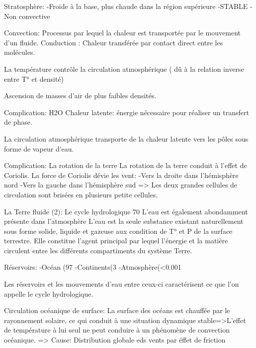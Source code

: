 Stratosphère:
-Froide à la base, plus chaude dans la région supérieure
-STABLE
-Non convective




Convection: Processus par lequel la chaleur est transportée par le mouvement d’un fluide.
Conduction : Chaleur transférée par contact direct entre les molécules.




La température contrôle la circulation atmosphérique ( dû  à la relation inverse entre T° et densité)


Ascension de masses d’air de plus faibles densités.
  

Complication: H2O
Chaleur latente: énergie nécessaire pour réaliser un transfert de phase.


La circulation atmosphérique transporte de la chaleur latente vers les pôles sous forme de vapeur d’eau.


Complication: La rotation de la terre
La rotation de la terre conduit à l’effet de Coriolis.
La force de Coriolis dévie les vent:
-Vers la droite dans l’hémisphère nord
-Vers la gauche dans l’hémisphère sud
=> Les deux grandes cellules de circulation sont brisées en plusieurs petite cellules.
  



La Terre fluide (2): Le cycle hydrologique
70%
L’eau est également abondamment présente dans l’atmosphère
L’eau est la seule substance existant naturellement sous forme solide, liquide et gazeuse aux condition de T° et P de la surface terrestre.
Elle constitue l’agent principal par lequel l’énergie et la matière circulent entre les différents compartiments du système Terre.


  





Réservoirs:
-Océan (97%
-Continents(3%
 -Atmosphère(<0.001%


Les réservoirs et les mouvements d’eau entre ceux-ci caractérisent ce que l’on appelle le cycle hydrologique.


  





Circulation océanique de surface:
La surface des océans est chauffée par le rayonnement solaire, ce qui conduit à une situation dynamique stable=>L’effet de température à lui seul ne peut conduire à un phénomène de convection océanique.
=> Cause: Distribution globale eds vents par éffet de friction


